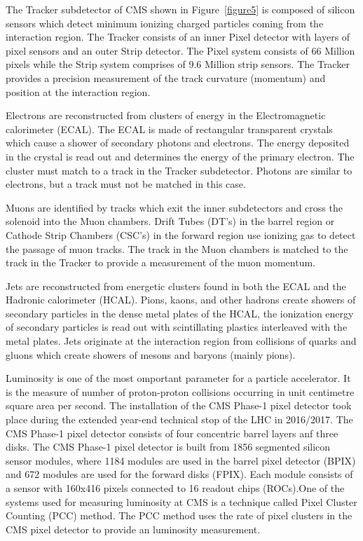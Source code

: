 \documentclass[final,3p]{CSP}
\begin{document}
The Tracker subdetector of CMS shown in Figure~\ref{figure5} is composed of silicon sensors which detect minimum ionizing charged particles coming from the interaction region. The Tracker consists of an inner Pixel detector with layers of pixel sensors and an outer Strip detector. The Pixel system consists of 66 Million pixels while the Strip system comprises of 9.6 Million strip sensors. The Tracker provides a precision measurement of the track curvature (momentum) and position at the interaction region.

Electrons are reconstructed from clusters of energy in the Electromagnetic calorimeter (ECAL). The ECAL is made of rectangular transparent crystals which cause a shower of secondary photons and electrons. The energy deposited in the crystal is read out and determines the energy of the primary electron. The cluster must match to a track in the Tracker subdetector. Photons are similar to electrons, but a track must not be matched in this case.

Muons are identified by tracks which exit the inner subdetectors and cross the solenoid into the Muon chambers. Drift Tubes (DT's) in the barrel region or Cathode Strip Chambers (CSC's) in the forward region use ionizing gas to detect the passage of muon tracks.  The track in the Muon chambers is matched to the track in the Tracker to provide a measurement of the muon momentum.

Jets are reconstructed from energetic clusters found in both the ECAL and the Hadronic calorimeter (HCAL).
Pions, kaons, and other hadrons create showers of secondary particles in the dense metal plates of the HCAL, the ionization energy of secondary particles is read out with scintillating plastics interleaved with the metal plates.  
Jets originate at the interaction region from collisions of quarks and gluons which create showers of mesons and baryons (mainly pions).


Luminosity is one of the most omportant parameter for a particle accelerator. It is the measure of number of proton-proton collisions occurring in unit centimetre square area per second. The installation of the CMS Phase-1 pixel detector took place during the extended year-end technical stop of the LHC in 2016/2017. The CMS Phase-1 pixel detector consists of four concentric barrel layers anf three disks. The CMS Phase-1 pixel detector is built from 1856 segmented silicon sensor modules,
where 1184 modules are used in the barrel pixel detector (BPIX) and 672 modules are used for the forward disks (FPIX). Each module consists of a sensor with 160x416 pixels connected to 16 readout chips (ROCs).One of the systems used for measuring luminosity at CMS is a technique called Pixel Cluster Counting (PCC) method. The PCC method uses the rate of pixel clusters in the CMS pixel detector to provide an luminosity measurement.
\end{document}
